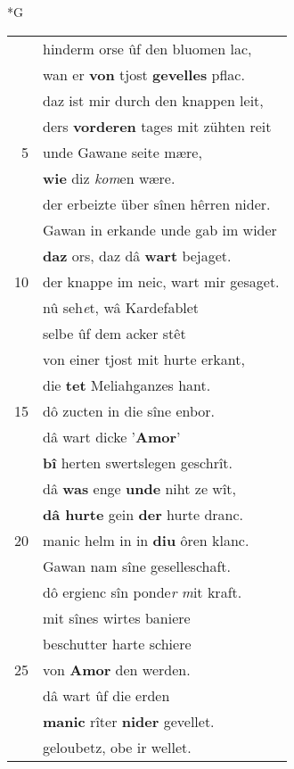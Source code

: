 \documentclass[8pt,a4paper,notitlepage]{article}
\begin{document}
\begin{table}[ht]
\begin{minipage}[t]{0.5\linewidth}
\small
\begin{center}*G
\end{center}
\begin{tabular}{rl}
 & hinderm orse ûf den bluomen lac,\\ 
 & wan er \textbf{von} tjost \textbf{gevelles} pflac.\\ 
 & daz ist mir durch den knappen leit,\\ 
 & ders \textbf{vorderen} tages mit zühten reit\\ 
5 & unde Gawane seite mære,\\ 
 & \textbf{wie} diz \textit{kom}en wære.\\ 
 & der erbeizte über sînen hêrren nider.\\ 
 & Gawan in erkande unde gab im wider\\ 
 & \textbf{daz} ors, daz dâ \textbf{wart} bejaget.\\ 
10 & der knappe im neic, wart mir gesaget.\\ 
 & nû seh\textit{e}t, wâ Kardefablet\\ 
 & selbe ûf dem acker stêt\\ 
 & von einer tjost mit hurte erkant,\\ 
 & die \textbf{tet} Meliahganzes hant.\\ 
15 & dô zucten in die sîne enbor.\\ 
 & dâ wart dicke '\textbf{Amor}'\\ 
 & \textbf{bî} herten swertslegen geschrît.\\ 
 & dâ \textbf{was} enge \textbf{unde} niht ze wît,\\ 
 & \textbf{dâ hurte} gein \textbf{der} hurte dranc.\\ 
20 & manic helm in in \textbf{diu} ôren klanc.\\ 
 & Gawan nam sîne geselleschaft.\\ 
 & dô ergienc sîn ponde\textit{r} \textit{m}it kraft.\\ 
 & mit sînes wirtes baniere\\ 
 & beschutter harte schiere\\ 
25 & von \textbf{Amor} den werden.\\ 
 & dâ wart ûf die erden\\ 
 & \textbf{manic} rîter \textbf{nider} gevellet.\\ 
 & geloubetz, obe ir wellet.\\ 

\end{tabular}
\end{minipage}
\end{table}
\end{document}
